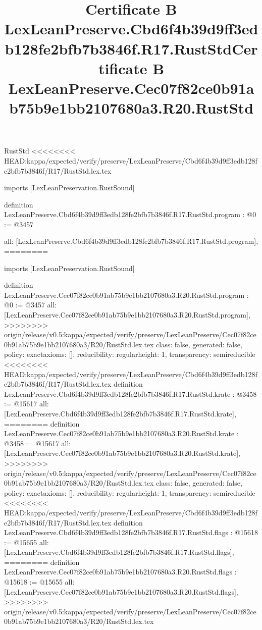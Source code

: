 \begin{lexlean}{RustStd}
<<<<<<<< HEAD:kappa/expected/verify/preserve/LexLeanPreserve/Cbd6f4b39d9ff3edb128fe2bfb7b3846f/R17/RustStd.lex.tex
\title{Certificate B LexLeanPreserve.Cbd6f4b39d9ff3edb128fe2bfb7b3846f.R17.RustStd}
\begin{coremodule}
imports [LexLeanPreservation.RustSound]

definition LexLeanPreserve.Cbd6f4b39d9ff3edb128fe2bfb7b3846f.R17.RustStd.program : @0 := @3457 {
  all: [LexLeanPreserve.Cbd6f4b39d9ff3edb128fe2bfb7b3846f.R17.RustStd.program],
========
\title{Certificate B LexLeanPreserve.Cec07f82ce0b91ab75b9e1bb2107680a3.R20.RustStd}
\begin{coremodule}
imports [LexLeanPreservation.RustSound]

definition LexLeanPreserve.Cec07f82ce0b91ab75b9e1bb2107680a3.R20.RustStd.program : @0 := @3457 {
  all: [LexLeanPreserve.Cec07f82ce0b91ab75b9e1bb2107680a3.R20.RustStd.program],
>>>>>>>> origin/release/v0.5:kappa/expected/verify/preserve/LexLeanPreserve/Cec07f82ce0b91ab75b9e1bb2107680a3/R20/RustStd.lex.tex
  class: false,
  generated: false,
  policy: exact{axioms: []},
  reducibility: regular{height: 1},
  transparency: semireducible
}
<<<<<<<< HEAD:kappa/expected/verify/preserve/LexLeanPreserve/Cbd6f4b39d9ff3edb128fe2bfb7b3846f/R17/RustStd.lex.tex
definition LexLeanPreserve.Cbd6f4b39d9ff3edb128fe2bfb7b3846f.R17.RustStd.krate : @3458 := @15617 {
  all: [LexLeanPreserve.Cbd6f4b39d9ff3edb128fe2bfb7b3846f.R17.RustStd.krate],
========
definition LexLeanPreserve.Cec07f82ce0b91ab75b9e1bb2107680a3.R20.RustStd.krate : @3458 := @15617 {
  all: [LexLeanPreserve.Cec07f82ce0b91ab75b9e1bb2107680a3.R20.RustStd.krate],
>>>>>>>> origin/release/v0.5:kappa/expected/verify/preserve/LexLeanPreserve/Cec07f82ce0b91ab75b9e1bb2107680a3/R20/RustStd.lex.tex
  class: false,
  generated: false,
  policy: exact{axioms: []},
  reducibility: regular{height: 1},
  transparency: semireducible
}
<<<<<<<< HEAD:kappa/expected/verify/preserve/LexLeanPreserve/Cbd6f4b39d9ff3edb128fe2bfb7b3846f/R17/RustStd.lex.tex
definition LexLeanPreserve.Cbd6f4b39d9ff3edb128fe2bfb7b3846f.R17.RustStd.flags : @15618 := @15655 {
  all: [LexLeanPreserve.Cbd6f4b39d9ff3edb128fe2bfb7b3846f.R17.RustStd.flags],
========
definition LexLeanPreserve.Cec07f82ce0b91ab75b9e1bb2107680a3.R20.RustStd.flags : @15618 := @15655 {
  all: [LexLeanPreserve.Cec07f82ce0b91ab75b9e1bb2107680a3.R20.RustStd.flags],
>>>>>>>> origin/release/v0.5:kappa/expected/verify/preserve/LexLeanPreserve/Cec07f82ce0b91ab75b9e1bb2107680a3/R20/RustStd.lex.tex
}}}
\end{coremodule}}
\end{coremodule}
\end{lexlean}
